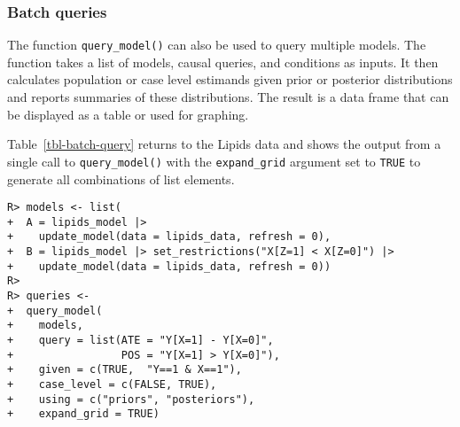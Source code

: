 \documentclass[
  11pt,
  article]{jss}
\begin{document}
\subsubsection{Batch queries}\label{batch-queries}

The function \texttt{query\_model()} can also be used to query multiple
models. The function takes a list of models, causal queries, and
conditions as inputs. It then calculates population or case level
estimands given prior or posterior distributions and reports summaries
of these distributions. The result is a data frame that can be displayed
as a table or used for graphing.

Table~\ref{tbl-batch-query} returns to the Lipids data and shows the
output from a single call to \texttt{query\_model()} with the
\texttt{expand\_grid} argument set to \texttt{TRUE} to generate all
combinations of list elements.

\begin{verbatim}
R> models <- list(
+  A = lipids_model |> 
+    update_model(data = lipids_data, refresh = 0),
+  B = lipids_model |> set_restrictions("X[Z=1] < X[Z=0]") |>
+    update_model(data = lipids_data, refresh = 0))
R> 
R> queries <- 
+  query_model(
+    models,  
+    query = list(ATE = "Y[X=1] - Y[X=0]", 
+                 POS = "Y[X=1] > Y[X=0]"),
+    given = c(TRUE,  "Y==1 & X==1"),
+    case_level = c(FALSE, TRUE),
+    using = c("priors", "posteriors"),
+    expand_grid = TRUE)
\end{verbatim}
\end{document}
